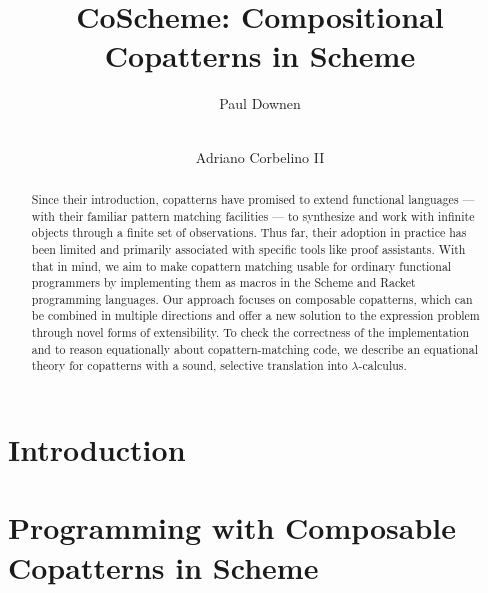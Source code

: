 \documentclass[runningheads]{llncs}
\begin{document}
%
\title{CoScheme: Compositional Copatterns in Scheme}
%
%
\author{
  Paul Downen
  \and \\
  Adriano Corbelino II
}
%
%
%
\maketitle              %
%
\begin{abstract}
  Since their introduction, copatterns have promised to extend functional languages --- with their familiar pattern matching facilities --- to synthesize and work with infinite objects through a finite set of observations.
 Thus far, their adoption in practice has been limited and primarily associated with specific tools like proof assistants.
 With that in mind, we aim to make copattern matching usable for ordinary functional programmers by implementing them as macros in the Scheme and Racket programming languages.
 Our approach focuses on composable copatterns, which can be combined in multiple directions and offer a new solution to the expression problem through novel forms of extensibility.
 To check the correctness of the implementation and to reason equationally about copattern-matching code, we describe an equational theory for copatterns with a sound, selective translation into $\lambda$-calculus.
\end{abstract}
%
%
%
\section{Introduction} \label{sec-intro}



\section{Programming with Composable Copatterns in Scheme}
\label{sec-examples}

\end{document}
